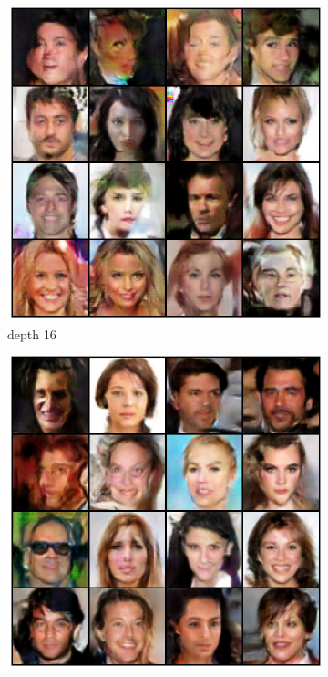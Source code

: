 \begin{frame}
\begin{center}
\begin{figure}[H]
\begin{subfigure}[b]{0.24\textwidth}
                \includegraphics[width=\textwidth]{resources/images/output_celeba_16.eps}
                \caption{depth 16}
                \label{fig:celeba_16}
            \end{subfigure}
            \hfill
            \begin{subfigure}[b]{0.24\textwidth}
                \centering
                \includegraphics[width=\textwidth]{resources/images/output_celeba_32.eps}

\end{subfigure}
\end{figure}
\end{center}
\end{frame}
